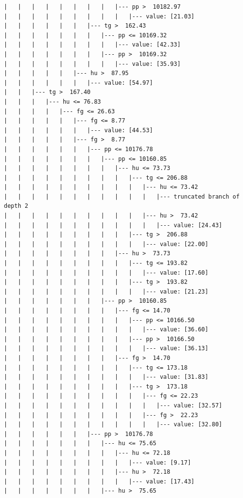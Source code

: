 \documentclass[UTF8, a4paper]{ctexart}
\begin{document}
\begin{lstlisting}
|   |   |   |   |   |   |   |   |--- pp >  10182.97
|   |   |   |   |   |   |   |   |   |--- value: [21.03]
|   |   |   |   |   |   |--- tg >  162.43
|   |   |   |   |   |   |   |--- pp <= 10169.32
|   |   |   |   |   |   |   |   |--- value: [42.33]
|   |   |   |   |   |   |   |--- pp >  10169.32
|   |   |   |   |   |   |   |   |--- value: [35.93]
|   |   |   |   |   |--- hu >  87.95
|   |   |   |   |   |   |--- value: [54.97]
|   |   |--- tg >  167.40
|   |   |   |--- hu <= 76.83
|   |   |   |   |--- fg <= 26.63
|   |   |   |   |   |--- fg <= 8.77
|   |   |   |   |   |   |--- value: [44.53]
|   |   |   |   |   |--- fg >  8.77
|   |   |   |   |   |   |--- pp <= 10176.78
|   |   |   |   |   |   |   |--- pp <= 10160.85
|   |   |   |   |   |   |   |   |--- hu <= 73.73
|   |   |   |   |   |   |   |   |   |--- tg <= 206.88
|   |   |   |   |   |   |   |   |   |   |--- hu <= 73.42
|   |   |   |   |   |   |   |   |   |   |   |--- truncated branch of depth 2
|   |   |   |   |   |   |   |   |   |   |--- hu >  73.42
|   |   |   |   |   |   |   |   |   |   |   |--- value: [24.43]
|   |   |   |   |   |   |   |   |   |--- tg >  206.88
|   |   |   |   |   |   |   |   |   |   |--- value: [22.00]
|   |   |   |   |   |   |   |   |--- hu >  73.73
|   |   |   |   |   |   |   |   |   |--- tg <= 193.82
|   |   |   |   |   |   |   |   |   |   |--- value: [17.60]
|   |   |   |   |   |   |   |   |   |--- tg >  193.82
|   |   |   |   |   |   |   |   |   |   |--- value: [21.23]
|   |   |   |   |   |   |   |--- pp >  10160.85
|   |   |   |   |   |   |   |   |--- fg <= 14.70
|   |   |   |   |   |   |   |   |   |--- pp <= 10166.50
|   |   |   |   |   |   |   |   |   |   |--- value: [36.60]
|   |   |   |   |   |   |   |   |   |--- pp >  10166.50
|   |   |   |   |   |   |   |   |   |   |--- value: [36.13]
|   |   |   |   |   |   |   |   |--- fg >  14.70
|   |   |   |   |   |   |   |   |   |--- tg <= 173.18
|   |   |   |   |   |   |   |   |   |   |--- value: [31.83]
|   |   |   |   |   |   |   |   |   |--- tg >  173.18
|   |   |   |   |   |   |   |   |   |   |--- fg <= 22.23
|   |   |   |   |   |   |   |   |   |   |   |--- value: [32.57]
|   |   |   |   |   |   |   |   |   |   |--- fg >  22.23
|   |   |   |   |   |   |   |   |   |   |   |--- value: [32.80]
|   |   |   |   |   |   |--- pp >  10176.78
|   |   |   |   |   |   |   |--- hu <= 75.65
|   |   |   |   |   |   |   |   |--- hu <= 72.18
|   |   |   |   |   |   |   |   |   |--- value: [9.17]
|   |   |   |   |   |   |   |   |--- hu >  72.18
|   |   |   |   |   |   |   |   |   |--- value: [17.43]
|   |   |   |   |   |   |   |--- hu >  75.65

\end{lstlisting}
\end{document}
